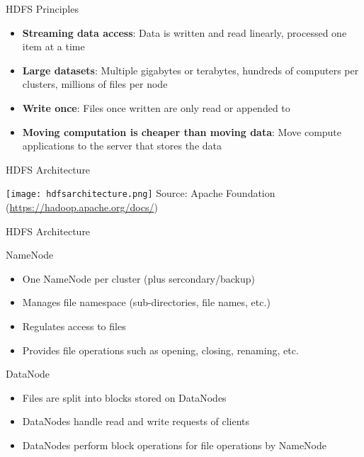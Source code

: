 \documentclass[ignorenonframetext,xcolor=x11names]{beamer}
\begin{document}
\begin{frame}{HDFS Principles}
\begin{itemize}
   \item \textbf{Streaming data access}: Data is written and read linearly, processed one item at a time
   \item \textbf{Large datasets}: Multiple gigabytes or terabytes, hundreds of computers per clusters, millions of files per node
   \item \textbf{Write once}: Files once written are only read or appended to
   \item \textbf{Moving computation is cheaper than moving data}: Move compute applications to the server that stores the data
\end{itemize}
\end{frame}

\begin{frame}{HDFS Architecture}
\centering

\texttt{[image: hdfsarchitecture.png]}
\scriptsize Source: Apache Foundation (\url{https://hadoop.apache.org/docs/})
\end{frame}

\begin{frame}{HDFS Architecture}
\begin{block}{NameNode}
\begin{itemize}
    \item One NameNode per cluster (plus sercondary/backup)
    \item Manages file namespace (sub-directories, file names, etc.)
    \item Regulates access to files
    \item Provides file operations such as opening, closing, renaming, etc.
\end{itemize}
\end{block}

\begin{block}{DataNode}
\begin{itemize}
   \item Files are split into blocks stored on DataNodes
   \item DataNodes handle read and write requests of clients
   \item DataNodes perform block operations for file operations by NameNode
\end{itemize}
\end{block}
\end{frame}
\end{document}
